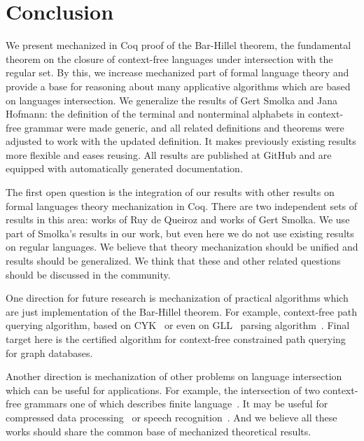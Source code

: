 \section{Conclusion}
\label{sec:conclusion}

We present mechanized in Coq proof of the Bar-Hillel theorem, the fundamental theorem on the closure of context-free languages under intersection with the regular set.
By this, we increase mechanized part of formal language theory and provide a base for reasoning about many applicative algorithms which are based on languages intersection.
We generalize the results of Gert Smolka and Jana Hofmann: the definition of the terminal and nonterminal alphabets in context-free grammar were made generic, and all related definitions and theorems were adjusted to work with the updated definition.
It makes previously existing results more flexible and eases reusing.
All results are published at GitHub and are equipped with automatically generated documentation.

The first open question is the integration of our results with other results on formal languages theory mechanization in Coq. 
There are two independent sets of results in this area: works of Ruy de Queiroz and works of Gert Smolka.
We use part of Smolka's results in our work, but even here we do not use existing results on regular languages.
We believe that theory mechanization should be unified and results should be generalized.
We think that these and other related questions should be discussed in the community.

One direction for future research is mechanization of practical algorithms which are just implementation of the Bar-Hillel theorem.
For example, context-free path querying algorithm, based on CYK~\cite{hellingsPathQuerying,zhang2016context} or even on GLL~\cite{scott2010gll} parsing algorithm~\cite{grigorev2016context}.
Final target here is the certified algorithm for context-free constrained path querying for graph databases.

Another direction is mechanization of other problems on language intersection which can be useful for applications.
For example, the intersection of two context-free grammars one of which describes finite language~\cite{nederhof2002parsing, nederhof2004language}.
It may be useful for compressed data processing~\cite{Lohrey2012AlgorithmicsOS} or speech recognition~\cite{Nederhof:2002:PNC:1073083.1073104,NEDERHOF2004172}.
And we believe all these works should share the common base of mechanized theoretical results.



